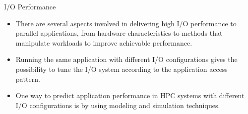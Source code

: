 \documentclass[compress,11pt,xcolor=svgnames,aspectratio=169]{beamer}
\begin{document}
\begin{frame}[fragile]{I/O Performance}

\begin{itemize}
\setlength\itemsep{0.8cm}

  \item There are several aspects involved in delivering high I/O performance to parallel applications, from hardware characteristics to methods that manipulate workloads to improve achievable performance.

  \item Running the same application with different I/O configurations gives the possibility to tune the I/O system according to the application access pattern.

  \item One way to predict application performance in HPC systems with different I/O configurations is by using modeling and simulation techniques.

\end{itemize}

\nocite{SOPPOAASLK13}

\end{frame}
\end{document}
